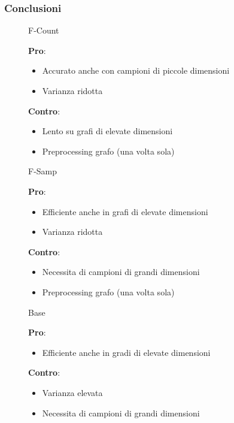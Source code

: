 \begin{frame}
	\frametitle{Conclusioni}
	\centering
	\begin{figure}[h]
		\begin{minipage}[t]{.32\textwidth}
			\centering
			\Large
			F-Count
			\medskip

			\small		
			\textbf{Pro}:
			\begin{itemize}
				\item Accurato anche con campioni di piccole dimensioni
				\item Varianza ridotta
			\end{itemize}
		
			\textbf{Contro}:
			\begin{itemize}
				\item Lento su grafi di elevate dimensioni
				\item Preprocessing grafo (una volta sola)
			\end{itemize}
		\end{minipage}\hfill
		\begin{minipage}[t]{.32\textwidth}
			\centering
			\Large
			F-Samp
			\medskip
			
			\small		
			\textbf{Pro}:
			\begin{itemize}
				\item Efficiente anche in grafi di elevate dimensioni
				\item Varianza ridotta
			\end{itemize}
			
			\textbf{Contro}:
			\begin{itemize}
				\item Necessita di campioni di grandi dimensioni
				\item Preprocessing grafo (una volta sola)
			\end{itemize}
		\end{minipage}\hfill
		\begin{minipage}[t]{.32\textwidth}
			\centering
			\Large
			Base
			\medskip
			
			\small		
			\textbf{Pro}:
			\begin{itemize}
				\item Efficiente anche in gradi di elevate dimensioni
			\end{itemize}
			
			\textbf{Contro}:
			\begin{itemize}
				\item Varianza elevata
				\item Necessita di campioni di grandi dimensioni
			\end{itemize}
		\end{minipage}\hfill
		
	\end{figure}
\end{frame}
